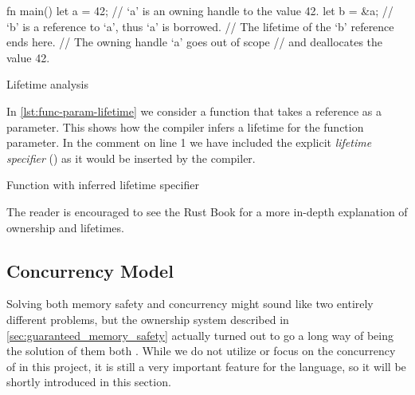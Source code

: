 \begin{listing}[H]
  \begin{rustcode}
fn main() {
  let a = 42;   // `a' is an owning handle to the value 42.
  {
    let b = &a; // `b' is a reference to `a', thus `a' is borrowed.
  }             // The lifetime of the `b' reference ends here.
}               // The owning handle `a' goes out of scope
                // and deallocates the value 42.
  \end{rustcode}
  \caption{Lifetime analysis}
  \label{lst:block-lifetime}
\end{listing}


In \autoref{lst:func-param-lifetime} we consider a function that takes a reference as a parameter.
This shows how the compiler infers a lifetime for the function parameter.
In the comment on line 1 we have included the explicit \emph{lifetime specifier} () as it would be inserted by the compiler.

\begin{listing}[H]
  \begin{rustcode}
// foo<'a>(x: &'a u32) { // lifetime specifier inferred by the compiler
fn foo(x: &u32) {
} // The lifetime of the `x' reference ends here.
fn main() {
  let a = 42; // `a' is an owning handle to the value 42.
  foo(&a);    // `a' is borrowed by the `foo' function.
}             // The owning handle `a' goes out of scope
              // and deallocates the value 42.
  \end{rustcode}
  \caption{Function with inferred lifetime specifier}
  \label{lst:func-param-lifetime}
\end{listing}

The reader is encouraged to see the Rust Book \cite{web:rust_book} for a more in-depth explanation of ownership and lifetimes.

\subsection{Concurrency Model} %
\label{ssub:concurrency_model}

Solving both memory safety and concurrency might sound like two entirely different problems, but the ownership system described in \autoref{sec:guaranteed_memory_safety} actually turned out to go a long way of being the solution of them both \cite{web:fearless_concurrency_with_rust}.
While we do not utilize or focus on the concurrency of {\rust} in this project, it is still a very important feature for the language, so it will be shortly introduced in this section.

